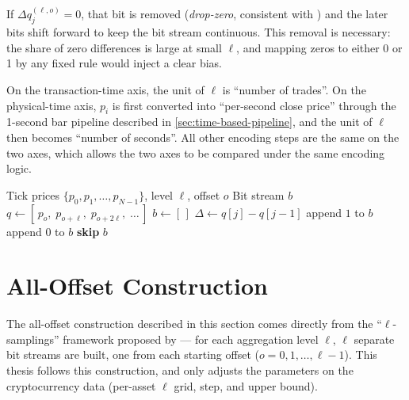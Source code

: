 \documentclass[11pt,titlepage,openany,oneside]{book}  %
\begin{document}
If $\Delta q^{(\ell, o)}_j = 0$, that bit is removed (\emph{drop-zero}, consistent with \citet{shternshis2025predictability}) and the later bits shift forward to keep the bit stream continuous. This removal is necessary: the share of zero differences is large at small $\ell$, and mapping zeros to either 0 or 1 by any fixed rule would inject a clear bias.

On the transaction-time axis, the unit of $\ell$ is ``number of trades''. On the physical-time axis, $p_i$ is first converted into ``per-second close price'' through the 1-second bar pipeline described in \cref{sec:time-based-pipeline}, and the unit of $\ell$ then becomes ``number of seconds''. All other encoding steps are the same on the two axes, which allows the two axes to be compared under the same encoding logic.

\begin{algorithm}
  \caption{Aggregation and bit encoding (single offset)}
  \label{alg:encode}
  \begin{algorithmic}[1]
    \Require Tick prices $\{p_0, p_1, \ldots, p_{N-1}\}$, level $\ell$, offset $o$
    \Ensure Bit stream $b$
    \State $q \gets [\,p_o,\; p_{o+\ell},\; p_{o+2\ell},\; \ldots\,]$
    \State $b \gets [\,]$
      \State $\Delta \gets q[j] - q[j-1]$
        \State append $1$ to $b$
        \State append $0$ to $b$
      \Else
        \State \textbf{skip} 
      \EndIf
    \EndFor
    \State \Return $b$
  \end{algorithmic}
\end{algorithm}

\section{All-Offset Construction}
\label{sec:all-offset}

The all-offset construction described in this section comes directly from the ``$\ell$-samplings'' framework proposed by \citet{onofri2025emergence} --- for each aggregation level $\ell$, $\ell$ separate bit streams are built, one from each starting offset ($o = 0, 1, \ldots, \ell - 1$). This thesis follows this construction, and only adjusts the parameters on the cryptocurrency data (per-asset $\ell$ grid, step, and upper bound).
\end{document}
